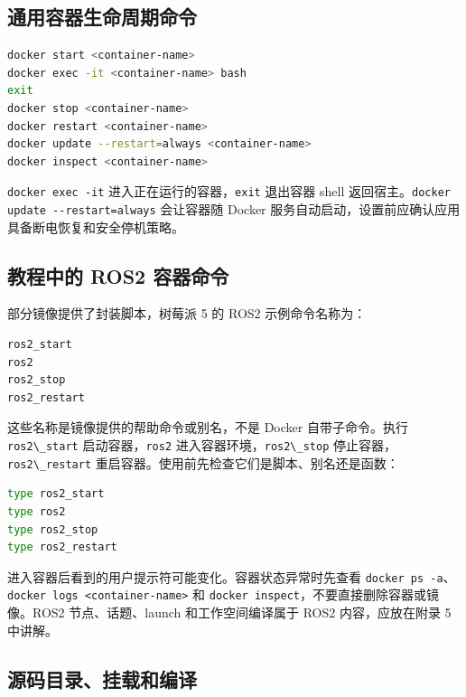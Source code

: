 \subsection{通用容器生命周期命令}\label{ux901aux7528ux5bb9ux5668ux751fux547dux5468ux671fux547dux4ee4}

\begin{lstlisting}[language=bash]
docker start <container-name>
docker exec -it <container-name> bash
exit
docker stop <container-name>
docker restart <container-name>
docker update --restart=always <container-name>
docker inspect <container-name>
\end{lstlisting}

\passthrough{\lstinline!docker exec -it!}
进入正在运行的容器，\passthrough{\lstinline!exit!} 退出容器 shell
返回宿主。\passthrough{\lstinline!docker update --restart=always!}
会让容器随 Docker
服务自动启动，设置前应确认应用具备断电恢复和安全停机策略。

\subsection{教程中的 ROS2
容器命令}\label{ux6559ux7a0bux4e2dux7684-ros2-ux5bb9ux5668ux547dux4ee4}

部分镜像提供了封装脚本，树莓派 5 的 ROS2 示例命令名称为：

\begin{lstlisting}[language=bash]
ros2_start
ros2
ros2_stop
ros2_restart
\end{lstlisting}

这些名称是镜像提供的帮助命令或别名，不是 Docker 自带子命令。执行
\passthrough{\lstinline!ros2\_start!}
启动容器，\passthrough{\lstinline!ros2!}
进入容器环境，\passthrough{\lstinline!ros2\_stop!}
停止容器，\passthrough{\lstinline!ros2\_restart!}
重启容器。使用前先检查它们是脚本、别名还是函数：

\begin{lstlisting}[language=bash]
type ros2_start
type ros2
type ros2_stop
type ros2_restart
\end{lstlisting}

进入容器后看到的用户提示符可能变化。容器状态异常时先查看
\passthrough{\lstinline!docker ps -a!}、\passthrough{\lstinline!docker logs <container-name>!}
和
\passthrough{\lstinline!docker inspect!}，不要直接删除容器或镜像。ROS2
节点、话题、launch 和工作空间编译属于 ROS2 内容，应放在附录 5 中讲解。

\subsection{源码目录、挂载和编译}\label{ux6e90ux7801ux76eeux5f55ux6302ux8f7dux548cux7f16ux8bd1}

